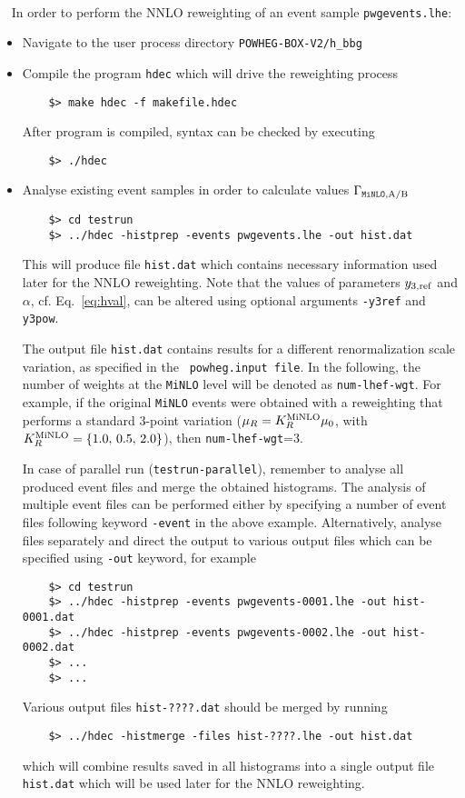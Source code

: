 \documentclass[11pt,a4paper]{article}\pdfoutput=1
\newcommand{\POWHEGBOXVTWO}{{\tt{POWHEG-BOX-V2}}}
\newcommand{\MINLO}{{\tt{MiNLO}}}
\newcommand{\hbbg}{{\tt{h\_bbg}}}
\begin{document}
~\\~
\noindent
In order to perform the NNLO reweighting of an event sample {\tt{pwgevents.lhe}}:
\begin{itemize}
  \renewcommand{\labelitemi}{$\rightarrow$}
\item Navigate to the user process directory \POWHEGBOXVTWO{}{\tt{/}}\hbbg{}
\item Compile the program {\tt{hdec}} which will drive the reweighting process
  \begin{lstlisting}
    $> make hdec -f makefile.hdec
  \end{lstlisting}
  After program is compiled, syntax can be checked by executing
  \begin{lstlisting}
    $> ./hdec
  \end{lstlisting}
\item Analyse existing event samples in order to calculate values
  $\Gamma_{\MINLO{},\rm{A/B}}$
  \begin{lstlisting}
    $> cd testrun
    $> ../hdec -histprep -events pwgevents.lhe -out hist.dat
  \end{lstlisting}
  This will produce file {\tt{hist.dat}} which contains necessary
  information used later for the NNLO reweighting. Note that the
  values of parameters $y_{3,\rm{ref}}$ and $\alpha$,
  cf. Eq.~\eqref{eq:hval}, can be altered using optional arguments
  {\tt{-y3ref}} and {\tt{y3pow}}.

  The output file {\tt{hist.dat}} contains results for a different
  renormalization scale variation, as specified in the {\tt
    powheg.input file}.  In the following, the number of weights at
  the \MINLO{} level will be denoted as {\tt num-lhef-wgt}. For
  example, if the original \MINLO{} events were obtained with a
  reweighting that performs a standard 3-point variation ($\mu_R =
  K_R^{\rm{MiNLO}} \mu_0$, with $K_R^{\rm{MiNLO}}=\{1.0,\, 0.5,\,
  2.0\}$), then {\tt num-lhef-wgt}=3.
  
  In case of parallel run ({\tt{testrun-parallel}}), remember to
  analyse all produced event files and merge the obtained histograms.
  The analysis of multiple event files can be performed either by
  specifying a number of event files following keyword {\tt{-event}}
  in the above example. Alternatively, analyse files separately and
  direct the output to various output files which can be specified
  using {\tt{-out}} keyword, for example
  \begin{lstlisting}
    $> cd testrun
    $> ../hdec -histprep -events pwgevents-0001.lhe -out hist-0001.dat
    $> ../hdec -histprep -events pwgevents-0002.lhe -out hist-0002.dat
    $> ...
    $> ...
  \end{lstlisting}
  Various output files {\tt{hist-????.dat}} should be merged by running
  \begin{lstlisting}
    $> ../hdec -histmerge -files hist-????.lhe -out hist.dat
  \end{lstlisting}
  which will combine results saved in all histograms into a single
  output file {\tt{hist.dat}} which will be used later for the NNLO
  reweighting.


\end{itemize}
\end{document}
